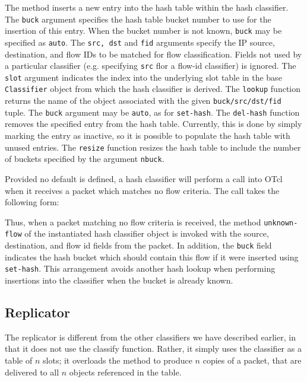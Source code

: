 {{The  method inserts a new entry into the hash
table within the hash classifier.
The {\tt buck} argument specifies the hash table bucket number
to use for the insertion of this entry.
When the bucket number is not known, {\tt buck} may be specified
as {\tt auto}. 
The {\tt src, dst} and {\tt fid} arguments specify the IP source,
destination, and flow IDs to be matched for flow classification.
Fields not used by a particular classifier (e.g. specifying {\tt src}
flor a flow-id classifier) is ignored.
The {\tt slot} argument indicates the index into the underlying
slot table in the base {\tt Classifier} object from which
the hash classifier is derived.
The {\tt lookup} function returns the name of the object
associated with the given {\tt buck/src/dst/fid} tuple.
The {\tt buck} argument may be {\tt auto}, as for {\tt set-hash}.
The {\tt del-hash} function removes the specified entry from
the hash table.
Currently, this is done by simply marking the entry as inactive,
so it is possible to populate the hash table with unused entries.
The {\tt resize} function resizes the hash table to include
the number of buckets specified by the argument {\tt nbuck}.

Provided no default is defined, a hash classifier will
perform a call into OTcl when it
receives a packet which matches no flow criteria.
The call takes the following form:
Thus, when a packet matching no flow criteria is received,
the method {\tt unknown-flow} of the instantiated hash classifier
object is invoked with the source, destination, and flow id
fields from the packet.
In addition, the {\tt buck} field indicates the hash bucket
which should contain this flow if it were inserted using
{\tt set-hash}.  This arrangement avoids another hash
lookup when performing insertions into the classifier when the
bucket is already known.

\subsection{Replicator}
\label{sec:node:replicator}

The replicator is different from the other classifiers
we have described earlier,
in that it does not use the classify function.
Rather, it simply uses the classifier as a table of $n$ slots;
it overloads the  method to produce $n$ copies
of a packet, that are delivered to all $n$ objects referenced in the table.

}}
